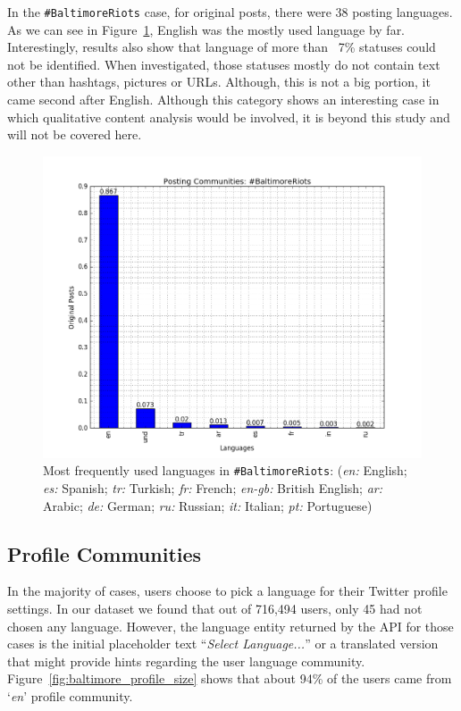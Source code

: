 In the {\texttt{\#BaltimoreRiots}} case, for original posts, there were 38 posting
languages. As we can see in Figure~\ref{fig:baltimore_langfreq}, 
English was the mostly used language by far. Interestingly, results also show that
language of more than ~7\% statuses could not be
identified. When investigated, those statuses mostly do not contain
text other than hashtags, pictures or URLs. Although, this is not a
big portion, it came second after English. Although this category
shows an interesting case in which qualitative content analysis would
be involved, it is beyond this study and will not be covered here.

\begin{figure}[htb]
\centering
\includegraphics[width=\columnwidth]{images/baltimore_langfreq.png}
\caption{Most frequently used languages in
  {\texttt{\#BaltimoreRiots}}: 
({\emph{en:}} English; {\emph{es:}} Spanish; {\emph{tr:}} Turkish;
  {\emph{fr:}} French; {\emph{en-gb:}} British English; {\emph{ar:}}
  Arabic; {\emph{de:}} German; {\emph{ru:}} Russian; {\emph{it:}}
  Italian; {\emph{pt:}} Portuguese)}
\label{fig:baltimore_langfreq}
\end{figure}

\subsection{Profile Communities}\label{baltimoreprofile}

In the majority of cases, users choose to pick a language for their
Twitter profile settings. In our dataset we found that out of 716,494
users, only 45 had not chosen any language. However, the language
entity returned by the API for those cases is the initial placeholder
text ``{\emph{Select Language...}}'' or a translated version that might provide
hints regarding the user language
community. Figure~\ref{fig:baltimore_profile_size} shows that about 94\% of the
users came from `{\emph{en}}' profile community.

